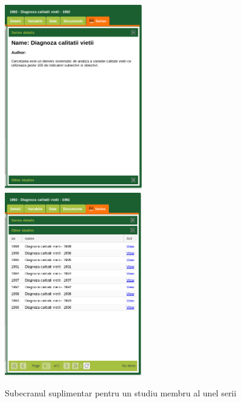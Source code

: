\begin{figure}[H]
\begin{centering}
\includegraphics[width=6cm]{screenshots/details-panel-series-member-series-details}\includegraphics[width=6cm]{screenshots/details-panel-series-member-series-studies}
\par\end{centering}
\caption{Subecranul suplimentar pentru un studiu membru al unel serii}
\end{figure}
